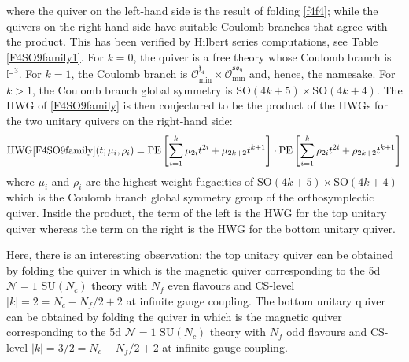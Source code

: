 \documentclass[a4paper,11pt]{article}
\newcommand{\Ncal}{\mathcal{N}}
\newcommand{\surm}{\mathrm{SU}}
\newcommand{\sorm}{\mathrm{SO}}
\newcommand{\HWG}{\mathrm{HWG}}
\newcommand{\PE}{\mathrm{PE}}
\begin{document}
where the quiver on the left-hand side is the result of folding \eqref{f4f4}; while the quivers on the right-hand side have suitable Coulomb branches that agree with the product. This has been verified by Hilbert series computations, see Table \ref{F4SO9family1}. 
For $k=0$, the quiver is a free theory whose Coulomb branch is $\mathbb{H}^3$.
For $k=1$, the Coulomb branch is $\overline{\mathcal{O}}^{\mathfrak{f}_4}_{\text{min}}\times \overline{\mathcal{O}}^{\mathfrak{so}_9}_{\text{min}}$ and, hence, the namesake. For $k>1$, the Coulomb branch global symmetry is $\sorm(4k+5)\times \sorm(4k+4)$.  The HWG of 
\eqref{F4SO9family} is then conjectured to be the product of the HWGs for the two unitary quivers on the right-hand side:
\begin{equation}
    \HWG\eqref{F4SO9family}(t;\mu_i,\rho_i)=
    \PE\left[\sum_{i=1}^k\mu_{2i}t^{2i}+\mu_{2k+2}t^{k+1}\right]
    \cdot
    \PE\left[\sum_{i=1}^k\rho_{2i}t^{2i}+\rho_{2k+2}t^{k+1}\right]
\end{equation}
where $\mu_i$ and $\rho_i$ are the highest weight fugacities of $\sorm(4k+5)\times\sorm(4k+4) $ which is the Coulomb branch global symmetry group of the orthosymplectic quiver. Inside the product, the term of the left is the HWG for the top unitary quiver whereas the term on the right is the HWG for the bottom unitary quiver.  

Here, there is an interesting observation: the top unitary quiver can be obtained by folding the quiver in  \cite[Tab.\ 17]{Cabrera:2018jxt} which is the magnetic quiver corresponding to the 5d $\Ncal=1$ $\surm(N_c)$ theory  with $N_f$ even flavours and CS-level $|k|=2=N_c-N_f/2 +2$ at infinite gauge coupling. The bottom unitary quiver can be obtained by folding the quiver in \cite[Tab.\ 17]{Cabrera:2018jxt} which is the magnetic quiver corresponding to the 5d $\Ncal=1$ $\surm(N_c)$ theory with $N_f$ odd flavours and CS-level $|k|=3/2=N_c-N_f/2 +2$ at infinite gauge coupling. 
% 
\end{document}

